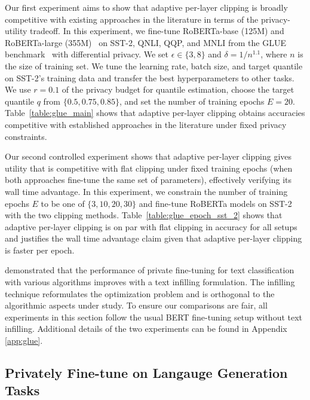 Our first experiment aims to show that adaptive per-layer clipping is broadly competitive with existing approaches in the literature in terms of the privacy-utility tradeoff. 
In this experiment, we fine-tune RoBERTa-base (125M) and RoBERTa-large (355M)~\citep{liu2019roberta} on SST-2, QNLI, QQP, and MNLI from the GLUE benchmark~\citep{wang2018glue} with differential privacy. 
We set $\epsilon\in \{3,8\}$ and $\delta=1/n^{1.1}$, where $n$ is the size of training set.
We tune the learning rate, batch size, and target quantile on SST-2's training data and transfer the best hyperparameters to other tasks. 
We use $r=0.1$ of the privacy budget for quantile estimation, choose the target quantile $q$ from $\{0.5, 0.75, 0.85\}$, and set the number of training epochs $E=20$.  %
Table~\ref{table:glue_main} shows that adaptive per-layer clipping obtains accuracies competitive with established approaches in the literature under fixed privacy constraints.

Our second controlled experiment shows that adaptive per-layer clipping gives utility that is competitive with flat clipping under fixed training epochs (when both approaches fine-tune the same set of parameters), effectively verifying its wall time advantage. 
In this experiment, we constrain the number of training epochs $E$ to be one of $\{3, 10, 20, 30\}$ and fine-tune RoBERTa models on SST-2 with the two clipping methods.
Table~\ref{table:glue_epoch_sst_2} shows that adaptive per-layer clipping is 
on par with flat clipping in accuracy for all setups and justifies the wall time advantage claim given that adaptive per-layer clipping is faster per epoch. 

\cite{li2022large} demonstrated that the performance of private fine-tuning for text classification with various algorithms improves with a text infilling formulation. 
The infilling technique reformulates the optimization problem and is orthogonal to the algorithmic aspects under study. 
To ensure our comparisons are fair, all experiments in this section follow the usual BERT fine-tuning setup without text infilling. 
Additional details of the two experiments can be found in Appendix \ref{app:glue}.



\subsection{Privately Fine-tune on Langauge Generation Tasks} \label{subsec:gpt}

